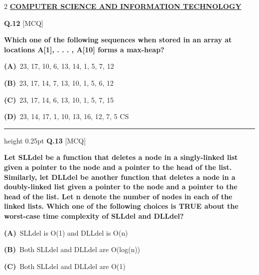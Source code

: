 \documentclass[a4paper,10pt,twoside]{article}
\begin{document}
\begin{multicols}{2}
\vspace{8pt}
\noindent\textbf{\large\underline{COMPUTER SCIENCE AND INFORMATION TECHNOLOGY}}\\[2pt]
\vspace{4pt}

\noindent\textbf{Q.12} \hfill {\footnotesize\textsf{[MCQ]}}
\par\vspace{2pt}
{\bfseries Which one of the following sequences when stored in an array at locations
A[1], . . . , A[10] forms a max-heap? \par}
\par\vspace{2pt}\noindent
\textbf{(A)}~23, 17, 10, 6, 13, 14, 1, 5, 7, 12\par\vspace{2pt}\noindent
\textbf{(B)}~23, 17, 14, 7, 13, 10, 1, 5, 6, 12\par\vspace{2pt}\noindent
\textbf{(C)}~23, 17, 14, 6, 13, 10, 1, 5, 7, 15\par\vspace{2pt}\noindent
\textbf{(D)}~23, 14, 17, 1, 10, 13, 16, 12, 7, 5 \newline CS
\par\vspace{6pt}\hrule height 0.25pt\vspace{6pt}
\noindent\textbf{Q.13} \hfill {\footnotesize\textsf{[MCQ]}}
\par\vspace{2pt}
{\bfseries Let SLLdel be a function that deletes a node in a singly-linked list given a pointer
to the node and a pointer to the head of the list. Similarly, let DLLdel be another
function that deletes a node in a doubly-linked list given a pointer to the node and
a pointer to the head of the list.
Let n denote the number of nodes in each of the linked lists. Which one of the
following choices is TRUE about the worst-case time complexity of SLLdel and
DLLdel? \par}
\par\vspace{2pt}\noindent
\textbf{(A)}~SLLdel is O(1) and DLLdel is O(n)\par\vspace{2pt}\noindent
\textbf{(B)}~Both SLLdel and DLLdel are O(log(n))\par\vspace{2pt}\noindent
\textbf{(C)}~Both SLLdel and DLLdel are O(1)\par\vspace{2pt}\noindent

\end{multicols}
\end{document}
